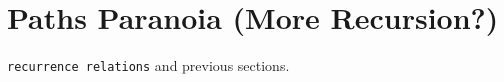 \section{Paths Paranoia (More Recursion?)}{\label{sec:paths}}
\begin{topics}
\verb!recurrence relations! and previous sections.
\end{topics}	





